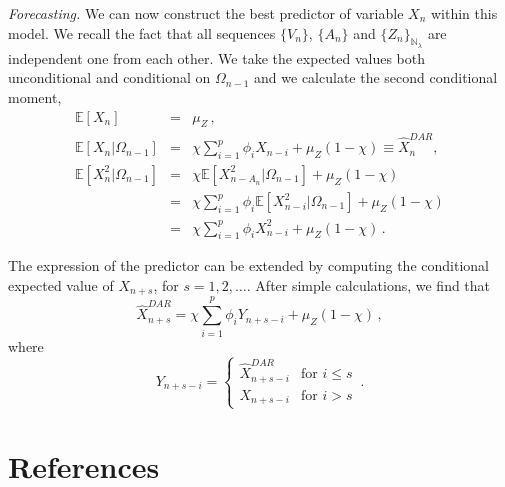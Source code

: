 \documentclass[12pt]{iopart}
\begin{document}
{\it Forecasting.}
We can now construct the best predictor of variable $X_n$ within this model. We recall the fact that all sequences $\lbrace V_n \rbrace$, $\lbrace A_n \rbrace$ and $\lbrace Z_n \rbrace_{\mathbb{N}_\lambda}$ are independent one from each other. We take the expected values both unconditional and conditional on $\Omega_{n-1}$ and we calculate the second conditional moment,
\begin{eqnarray}
\mathbb{E}[X_n]&=&\mu_Z\,, \nonumber \\
\mathbb{E}[X_n|\Omega_{n-1}]&=&\chi \sum_{i=1}^p \phi_i X_{n-i} +\mu_Z(1-\chi)\equiv\hat{X}^{DAR}_n, \nonumber \\
\mathbb{E}[X^2_n|\Omega_{n-1}]&=&\chi \mathbb{E}[X^2_{n-A_n}|\Omega_{n-1}]+\mu_Z(1-\chi) \nonumber \\ &=&\chi \sum_{i=1}^p\phi_i \mathbb{E}[X^2_{n-i}|\Omega_{n-1}]+\mu_Z(1-\chi) \nonumber \\
&=&\chi \sum_{i=1}^p\phi_i X^2_{n-i}+\mu_Z(1-\chi)\,. \label{eqn:preddar}
\end{eqnarray}

The expression of the predictor can be extended by computing the conditional expected value of $X_{n+s}$, for $s=1,2,\ldots$. After simple calculations, we find that
\begin{equation}
  \hat{X}_{n+s}^{DAR}=\chi\sum_{i=1}^p \phi_i Y_{n+s-i}+\mu_Z(1-\chi)\,,
  \label{eqn:epshat}
\end{equation}
where
\begin{equation*}
Y_{n+s-i} =
\left\{
\begin{array}{rl}
\hat{X}_{n+s-i}^{DAR} & \mbox{for } i \leqslant s \\
X_{n+s-i} & \mbox{for } i > s
\end{array}
\right.\,.
\end{equation*}

\section*{References}
\end{document}
